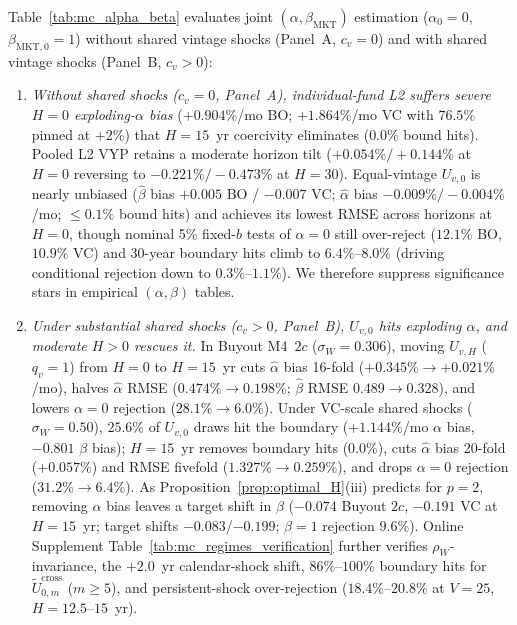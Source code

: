 \documentclass[12pt]{article}
\begin{document}
Table~\ref{tab:mc_alpha_beta} evaluates joint $(\alpha,\beta_{\mathrm{MKT}})$ estimation ($\alpha_0 = 0$, $\beta_{\mathrm{MKT},0} = 1$) without shared vintage shocks (Panel~A, $c_v = 0$) and with shared vintage shocks (Panel~B, $c_v > 0$):
\begin{enumerate}
  \item \emph{Without shared shocks ($c_v = 0$, Panel~A), individual-fund L2 suffers severe $H=0$ exploding-$\alpha$ bias} ($+0.904\%$/mo BO; $+1.864\%$/mo VC with $76.5\%$ pinned at $+2\%$) that $H = 15$~yr coercivity eliminates ($0.0\%$ bound hits). Pooled L2 VYP retains a moderate horizon tilt ($+0.054\% / +0.144\%$ at $H=0$ reversing to $-0.221\% / -0.473\%$ at $H=30$). Equal-vintage $U_{v,0}$ is nearly unbiased ($\hat\beta$ bias $+0.005$ BO / $-0.007$ VC; $\hat\alpha$ bias $-0.009\% / -0.004\%$/mo; $\le 0.1\%$ bound hits) and achieves its lowest RMSE across horizons at $H=0$, though nominal 5\% fixed-$b$ tests of $\alpha = 0$ still over-reject ($12.1\%$ BO, $10.9\%$ VC) and 30-year boundary hits climb to $6.4\%$--$8.0\%$ (driving conditional rejection down to $0.3\%$--$1.1\%$). We therefore suppress significance stars in empirical $(\alpha,\beta)$ tables.
  \item \emph{Under substantial shared shocks ($c_v > 0$, Panel~B), $U_{v,0}$ hits exploding $\alpha$, and moderate $H > 0$ rescues it.} In Buyout M4~$2c$ ($\sigma_W = 0.306$), moving $U_{v,H}$ ($q_v = 1$) from $H=0$ to $H=15$~yr cuts $\hat\alpha$ bias 16-fold ($+0.345\% \to +0.021\%$/mo), halves $\hat\alpha$ RMSE ($0.474\% \to 0.198\%$; $\hat\beta$ RMSE $0.489 \to 0.328$), and lowers $\alpha=0$ rejection ($28.1\% \to 6.0\%$). Under VC-scale shared shocks ($\sigma_W = 0.50$), $25.6\%$ of $U_{v,0}$ draws hit the boundary ($+1.144\%$/mo $\alpha$ bias, $-0.801$ $\beta$ bias); $H = 15$~yr removes boundary hits ($0.0\%$), cuts $\hat\alpha$ bias 20-fold ($+0.057\%$) and RMSE fivefold ($1.327\% \to 0.259\%$), and drops $\alpha=0$ rejection ($31.2\% \to 6.4\%$). As Proposition~\ref{prop:optimal_H}(iii) predicts for $p=2$, removing $\alpha$ bias leaves a target shift in $\beta$ ($-0.074$ Buyout $2c$, $-0.191$ VC at $H=15$~yr; target shifts $-0.083$/$-0.199$; $\beta=1$ rejection $9.6\%$). Online Supplement Table~\ref{tab:mc_regimes_verification} further verifies $\rho_W$-invariance, the $+2.0$~yr calendar-shock shift, $86\%$--$100\%$ boundary hits for $\widetilde{U}_{0,m}^{\mathrm{cross}}$ ($m \ge 5$), and persistent-shock over-rejection ($18.4\%$--$20.8\%$ at $V=25$, $H=12.5$--$15$~yr).
\end{enumerate}
\end{document}
